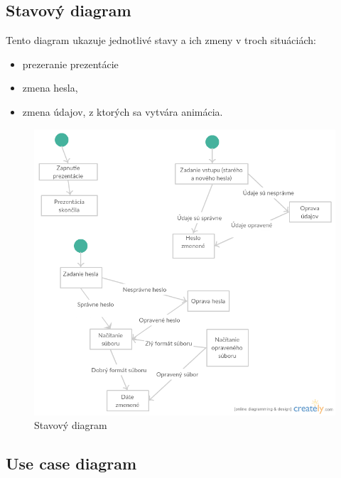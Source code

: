 \documentclass[12pt,a4paper]{report}
\begin{document}
\subsection[Stavový diagram]{\rmfamily\bfseries
	Stavový diagram}
Tento diagram ukazuje jednotlivé stavy a ich zmeny v troch situáciách:
\begin{itemize}
	\item prezeranie prezentácie
	\item zmena hesla,
	\item zmena údajov, z ktorých sa vytvára animácia.
\end{itemize}
\begin{figure}[htb]
	\includegraphics[scale=0.6]{Stavovy_diagram}
	\caption{Stavový diagram}
	\label{subsection:Stavový diagram}
\end{figure}


\subsection[Use case diagram]{\rmfamily\bfseries
	Use case diagram}
\end{document}
